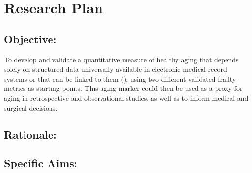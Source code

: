 \section{Research Plan }\label{research-plan}


\subsection{Objective:}\label{objective}
  
To develop and validate a quantitative measure of healthy aging that depends solely on structured data universally available in electronic medical record systems or that can be linked to them (),
using two different validated frailty metrics as starting points. This
aging marker could then be used as a proxy for aging in retrospective
and observational studies, as well as to inform medical and surgical
decisions.


\subsection{Rationale:}\label{rationale}

\subsection{Specific Aims:}\label{specific-aims}
